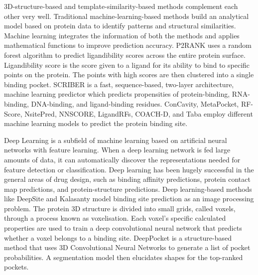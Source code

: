 \documentclass[journal=jcisd8,manuscript=article]{achemso}
\begin{document}
3D-structure-based and template-similarity-based methods complement each other very well. Traditional machine-learning-based methods build an analytical model based on protein data to identify patterns and structural similarities. Machine learning integrates the information of both the methods and applies mathematical functions to improve prediction accuracy. P2RANK\cite{krivak2015improving}\cite{krivak2018p2rank} uses a random forest algorithm to predict ligandibility scores across the entire protein surface. Ligandibility score is the score given to a ligand for its ability to bind to specific points on the protein. The points with high scores are then clustered into a single binding pocket. SCRIBER\cite{zhang2019scriber} is a fast, sequence-based, two-layer architecture, machine learning predictor which predicts propensities of protein-binding, RNA-binding, DNA-binding, and ligand-binding residues. ConCavity\cite{capra2009predicting}, MetaPocket\cite{huang2009metapocket}, RF-Score\cite{ballester2010machine}, NsitePred\cite{chen2012prediction}, NNSCORE\cite{durrant2010nnscore}\cite{durrant2011nnscore}, LigandRFs\cite{chen2014ligandrfs}, COACH-D\cite{wu2018coach}, and Taba\cite{da2020taba} employ different machine learning models to predict the protein binding site.

Deep Learning is a subfield of machine learning based on artificial neural networks with feature learning. When a deep learning network is fed large amounts of data, it can automatically discover the representations needed for feature detection or classification. Deep learning has been hugely successful in the general areas of drug design, such as binding affinity predictions\cite{jimenez2018k,ozturk2018deepdta}, protein contact map predictions\cite{hanson2018accurate,wang2017accurate}, and protein-structure predictions\cite{senior2020improved,li2019ensembling,tiwari2020network}. Deep learning-based methods like DeepSite\cite{jimenez2017deepsite} and Kalasanty\cite{stepniewska2020improving} model binding site prediction as an image processing problem. The protein 3D structure is divided into small grids, called voxels, through a process known as voxelisation. Each voxel's specific calculated properties are used to train a deep convolutional neural network that predicts whether a voxel belongs to a binding site. DeepPocket\cite{aggarwal2021deeppocket} is a structure-based method that uses 3D Convolutional Neural Networks to generate a list of pocket probabilities. A segmentation model then elucidates shapes for the top-ranked pockets.
\end{document}

